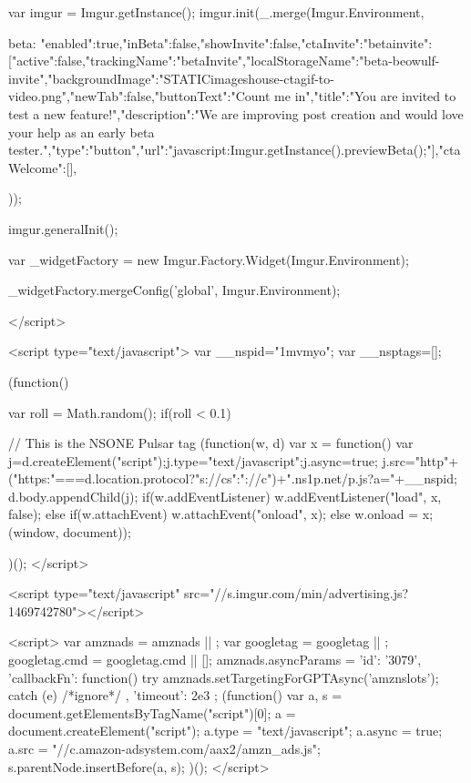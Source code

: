 {{            var imgur = Imgur.getInstance();
            imgur.init(_.merge(Imgur.Environment, {
                
                
                beta: {"enabled":true,"inBeta":false,"showInvite":false,"ctaInvite":{"betainvite":[{"active":false,"trackingName":"betaInvite","localStorageName":"beta-beowulf-invite","backgroundImage":"{STATIC}\/images\/house-cta\/gif-to-video.png","newTab":false,"buttonText":"Count me in","title":"You are invited to test a new feature!","description":"We are improving post creation and would love your help as an early beta tester.","type":"button","url":"javascript:Imgur.getInstance().previewBeta();"}]},"ctaWelcome":[]},
            }));

            imgur.generalInit();

            

            var _widgetFactory = new Imgur.Factory.Widget(Imgur.Environment);

            _widgetFactory.mergeConfig('global', Imgur.Environment);

            
        </script>

        <script type="text/javascript">
            var __nspid="1mvmyo";
            var __nsptags=[];

            (function() {
                var roll = Math.random();
                if(roll < 0.1) {
                    
                        // This is the NSONE Pulsar tag
                        (function(w, d) { var x = function() {
                        var j=d.createElement("script");j.type="text/javascript";j.async=true;
                        j.src="http"+("https:"===d.location.protocol?"s://cs":"://c")+".ns1p.net/p.js?a="+__nspid;
                        d.body.appendChild(j); }
                        if(w.addEventListener) { w.addEventListener("load", x, false); }
                        else if(w.attachEvent) { w.attachEvent("onload", x); }
                        else { w.onload = x; }
                        }(window, document));

                    
                }
            })();
        </script>

    

                        <script type="text/javascript" src="//s.imgur.com/min/advertising.js?1469742780"></script>

<script>
    var amznads = amznads || { };
    var googletag = googletag || { };
    googletag.cmd = googletag.cmd || [];
    amznads.asyncParams = {
        'id': '3079',
        'callbackFn': function() {
            try {
                amznads.setTargetingForGPTAsync('amznslots');
            } catch (e) { /*ignore*/ }
        },
        'timeout': 2e3
    };
    (function() {
        var a, s = document.getElementsByTagName("script")[0];
        a = document.createElement("script");
        a.type = "text/javascript";
        a.async = true;
        a.src = "//c.amazon-adsystem.com/aax2/amzn_ads.js";
        s.parentNode.insertBefore(a, s);
    })();
</script>

}}
